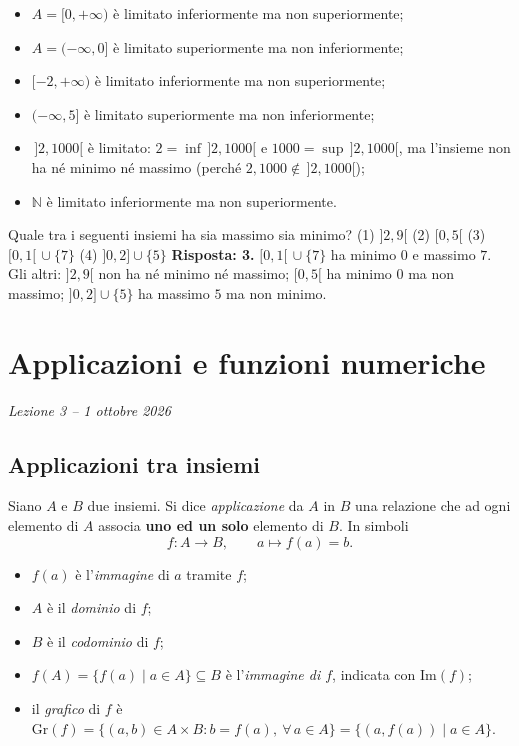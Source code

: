 \documentclass[11pt,a4paper]{article}
\begin{document}
\begin{esempio}
\leavevmode
\begin{itemize}
    \item $A = [0, +\infty)$ è limitato inferiormente ma non superiormente;
    \item $A = (-\infty, 0]$ è limitato superiormente ma non inferiormente;
    \item $[-2, +\infty)$ è limitato inferiormente ma non superiormente;
    \item $(-\infty, 5]$ è limitato superiormente ma non inferiormente;
    \item $\,]2, 1000[$ è limitato: $2 = \inf\,]2, 1000[$ e
          $1000 = \sup\,]2, 1000[$, ma l'insieme non ha né minimo né massimo
          (perché $2, 1000 \notin \,]2, 1000[$);
    \item $\mathbb{N}$ è limitato inferiormente ma non superiormente.
\end{itemize}
\end{esempio}

\begin{esercizio}
Quale tra i seguenti insiemi ha sia massimo sia minimo?
(1) $]2, 9[$ \qquad (2) $[0, 5[$ \qquad (3) $[0, 1[ \,\cup \{7\}$ \qquad (4) $]0, 2] \cup \{5\}$
\textbf{Risposta: 3.} $[0, 1[ \,\cup \{7\}$ ha minimo $0$ e massimo $7$. Gli altri: $]2, 9[$ non ha né minimo né massimo; $[0, 5[$ ha minimo $0$ ma non massimo; $]0, 2] \cup \{5\}$ ha massimo $5$ ma non minimo.
\end{esercizio}

\section[Applicazioni e funzioni numeriche (Lezione 3 -- 1 ottobre 2026)]{Applicazioni e funzioni numeriche}
\noindent\emph{Lezione 3 -- 1 ottobre 2026}
\subsection{Applicazioni tra insiemi}

\begin{definizione}
Siano $A$ e $B$ due insiemi. Si dice \emph{applicazione} da $A$ in $B$ una relazione che ad ogni elemento di $A$ associa \textbf{uno ed un solo} elemento di $B$. In simboli
\[
f : A \to B, \qquad a \mapsto f(a) = b.
\]
\end{definizione}

\begin{itemize}
    \item $f(a)$ è l'\emph{immagine} di $a$ tramite $f$;
    \item $A$ è il \emph{dominio} di $f$;
    \item $B$ è il \emph{codominio} di $f$;
    \item $f(A) = \{f(a) \mid a \in A\} \subseteq B$ è l'\emph{immagine di $f$}, indicata con $\mathrm{Im}(f)$;
    \item il \emph{grafico} di $f$ è
    $\mathrm{Gr}(f) = \{(a, b) \in A \times B : b = f(a),\ \forall\, a \in A\} = \{(a, f(a)) \mid a \in A\}$.
\end{itemize}
\end{document}
